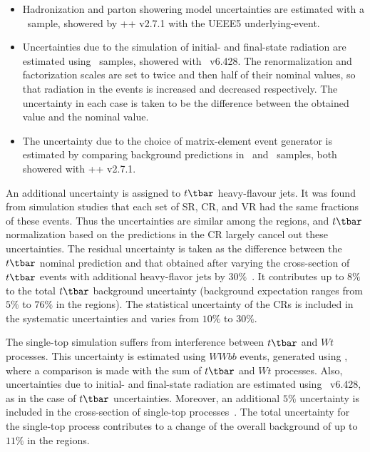 \begin{itemize}

	\item Hadronization and parton showering model uncertainties are estimated with
	      a \POWHEG~sample, showered by \MYHERWIG++ v2.7.1 with the UEEE5
	      underlying-event.

	\item Uncertainties due to the simulation of initial- and final-state radiation
	      are estimated using \POWHEG~samples, showered with \PYTHIA~v6.428. The
	      renormalization and factorization scales are set to twice and then half of
	      their nominal values, so that radiation in the events is increased and
	      decreased respectively. The uncertainty in each case is taken to be the
	      difference between the obtained value and the nominal value.

	\item The uncertainty due to the choice of matrix-element event generator is
	      estimated by comparing background predictions in \MGMCatNLO~and
	      \POWHEG~samples, both showered with \MYHERWIG++ v2.7.1.

\end{itemize}

An additional uncertainty is assigned to $t\tbar$ heavy-flavour jets. It was
found from simulation studies that each set of SR, CR, and VR had the same
fractions of these events. Thus the uncertainties are similar among the
regions, and $t\tbar$ normalization based on the predictions in the CR largely
cancel out these uncertainties. The residual uncertainty is taken as the
difference between the $t\tbar$ nominal prediction and that obtained after
varying the cross-section of $t\tbar$ events with additional heavy-flavor jets
by $30\%$~\cite{TOPQ-2014-10}. It contributes up to $8\%$ to the total $t\tbar$
background uncertainty (background expectation ranges from $5\%$ to $76\%$ in
the regions). The statistical uncertainty of the CRs is included in the
systematic uncertainties and varies from $10\%$ to $30\%$.

The single-top simulation suffers from interference between $t\tbar$ and $Wt$
processes. This uncertainty is estimated using $WWbb$ events, generated using
\MGMCatNLO, where a comparison is made with the sum of $t\tbar$ and $Wt$
processes. Also, uncertainties due to initial- and final-state radiation are
estimated using \PYTHIA~v6.428, as in the case of $t\tbar$ uncertainties.
Moreover, an additional $5\%$ uncertainty is included in the cross-section of
single-top processes~\cite{TOPQ-2014-10}. The total uncertainty for the
single-top process contributes to a change of the overall background of up to
$11\%$ in the regions.

